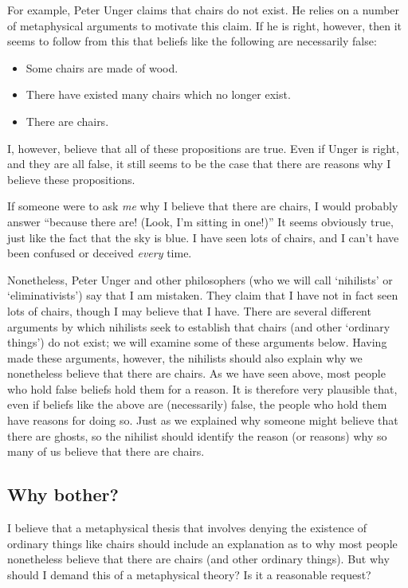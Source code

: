 \documentclass[11pt]{standalone}
\begin{document}
\begin{spacing}{1.5}
For example, Peter Unger claims that chairs do not exist.  He relies
on a number of metaphysical arguments to motivate this claim.  If he
is right, however, then it seems to follow from this that beliefs like
the following are necessarily false:

\begin{itemize}
  \item Some chairs are made of wood.
  \item There have existed many chairs which no longer exist.
  \item There are chairs.
\end{itemize}

I, however, believe that all of these propositions are true.  Even if
Unger is right, and they are all false, it still seems to be the case
that there are reasons why I believe these propositions.

If someone were to ask {\em me} why I believe that there are chairs, I
would probably answer ``because there are!  (Look, I'm sitting in
one!)''  It seems obviously true, just like the fact that the sky is
blue.  I have seen lots of chairs, and I can't have been confused or
deceived {\em every} time.

Nonetheless, Peter Unger and other philosophers (who we will call
`nihilists' or `eliminativists') say that I am mistaken.  They claim
that I have not in fact seen lots of chairs, though I may believe that
I have.  There are several different arguments by which nihilists seek
to establish that chairs (and other `ordinary things') do not exist;
we will examine some of these arguments below.  Having made these
arguments, however, the nihilists should also explain why we
nonetheless believe that there are chairs.  As we have seen above,
most people who hold false beliefs hold them for a reason.  It is
therefore very plausible that, even if beliefs like the above are
(necessarily) false, the people who hold them have reasons for doing
so.  Just as we explained why someone might believe that there are
ghosts, so the nihilist should identify the reason (or reasons) why so
many of us believe that there are chairs.

\subsection{Why bother?}
I believe that a metaphysical thesis that involves denying the
existence of ordinary things like chairs should include an explanation
as to why most people nonetheless believe that there are chairs (and
other ordinary things).  But why should I demand this of a
metaphysical theory?  Is it a reasonable request?


\end{spacing}
\end{document}
